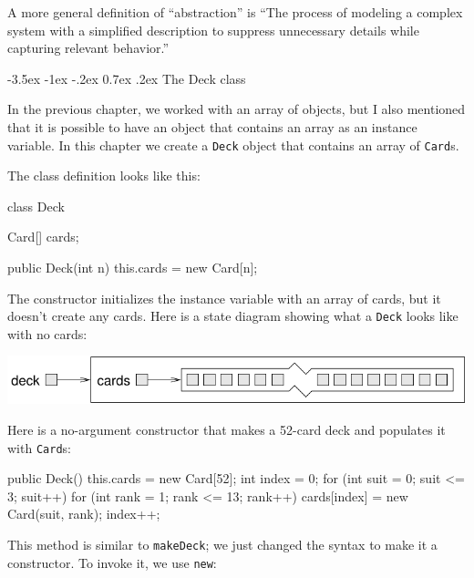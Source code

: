 \documentclass[12pt]{book}
\makeatletter
\renewcommand{\section}{\@startsection {section}{1}{\z@}%
    {-3.5ex \@plus -1ex \@minus -.2ex}%
    {0.7ex \@plus.2ex}%
    {\normalfont\Large\bfseries}}
\theoremstyle{exercise}
\newcommand{\java}[1]{\lstinline{#1}} %
\makeatother
\begin{document}

A more general definition of ``abstraction'' is ``The process of modeling a complex system with a simplified description to suppress unnecessary details while capturing relevant behavior.''


\section{The Deck class}
\label{deck}

In the previous chapter, we worked with an array of objects, but I also mentioned that it is possible to have an object that contains an array as an instance variable.
In this chapter we create a \java{Deck} object that contains an array of \java{Card}s.


The class definition looks like this:

\begin{code}
class Deck {
    Card[] cards;

    public Deck(int n) {
        this.cards = new Card[n];
    }
}
\end{code}

The constructor initializes the instance variable with an array of cards, but it doesn't create any cards.
Here is a state diagram showing what a \java{Deck} looks like with no cards:


\begin{center}
\includegraphics{figs/deckobject.pdf}
\end{center}

Here is a no-argument constructor that makes a 52-card deck and populates it with \java{Card}s:

\begin{code}
    public Deck() {
        this.cards = new Card[52];
        int index = 0;
        for (int suit = 0; suit <= 3; suit++) {
            for (int rank = 1; rank <= 13; rank++) {
                cards[index] = new Card(suit, rank);
                index++;
            }
        }
    }
\end{code}

This method is similar to \java{makeDeck};
we just changed the syntax to make it a constructor.
To invoke it, we use \java{new}:
\end{document}
